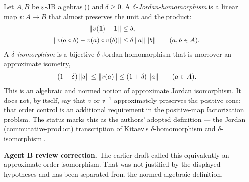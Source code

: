 \begin{definition}\label{def:eps-jb-iso}
\;
Let $A,B$ be $\varepsilon$-JB algebras () and $\delta\ge 0$. A
\emph{$\delta$-Jordan-homomorphism} is a linear map $v\colon A\to B$ that
almost preserves the unit and the product:
\begin{align}
\label{eq:jb-hom-unit}
\lVert v(\mathbf{1})-\mathbf{1} \rVert &\le \delta,\\[2pt]
\label{eq:jb-hom-mult}
\lVert v(a\circ b)-v(a)\circ v(b) \rVert &\le \delta\,\lVert a \rVert\,\lVert b \rVert
\qquad(a,b\in A).
\end{align}
A \emph{$\delta$-isomorphism} is a bijective $\delta$-Jordan-homomorphism that
is moreover an approximate isometry,
\begin{equation}
\label{eq:jb-iso-norm}
(1-\delta)\,\lVert a \rVert\le\lVert v(a) \rVert\le(1+\delta)\,\lVert a \rVert
\qquad(a\in A).
\end{equation}
This is an algebraic and normed notion of approximate Jordan isomorphism. It
does not, by itself, say that $v$ or $v^{-1}$ approximately preserves the
positive cone; that order control is an additional requirement in the
positive-map factorization problem. The status  marks this as
the authors' adopted definition --- the Jordan (commutative-product)
transcription of Kitaev's $\delta$-homomorphism and $\delta$-isomorphism
\cite{Kitaev2024}.

\smallskip\noindent\textbf{Agent B review correction.}
The earlier draft called this equivalently an approximate order-isomorphism. That
was not justified by the displayed hypotheses and has been separated from the
normed algebraic definition.
\end{definition}
